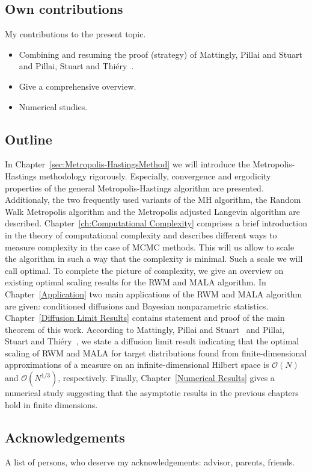 \subsection*{Own contributions}

My contributions to the present topic.
\begin{itemize}
 \item Combining and resuming the proof (strategy) of Mattingly, Pillai and Stuart~\autocite{Mattingly2010} and Pillai, Stuart and Thi\'{e}ry~\autocite{Pillai2012}.
 \item Give a comprehensive overview.
 \item Numerical studies.
\end{itemize}


\subsection*{Outline}

In Chapter~\ref{sec:Metropolis-HastingsMethod} we will introduce the Metropolis-Hastings methodology rigorously. Especially, convergence and ergodicity properties of the general Metropolis-Hastings algorithm are presented. Additionaly, the two frequently used variants of the MH algorithm, the Random Walk Metropolis algorithm and the Metropolis adjusted Langevin algorithm are described. Chapter~\ref{ch:Computational Complexity} comprises a brief introduction in the theory of computational complexity and describes different ways to measure complexity in the case of MCMC methods. This will us allow to scale the algorithm in such a way that the complexity is minimal. Such a scale we will call optimal. To complete the picture of complexity, we give an overview on existing optimal scaling results for the RWM and MALA algorithm. In Chapter~\ref{Application} two main applications of the RWM and MALA algorithm are given: conditioned diffusions and Bayesian nonparametric statistics. Chapter~\ref{Diffusion Limit Results} contains statement and proof of the main theorem of this work. According to Mattingly, Pillai and Stuart~\autocite{Mattingly2010} and Pillai, Stuart and Thi\'{e}ry~\autocite{Pillai2012}, we state a diffusion limit result indicating that the optimal scaling of RWM and MALA  for target distributions found from finite-dimensional approximations of a measure on an infinite-dimensional Hilbert space is $\mathcal{O}(N)$ and $\mathcal{O}(N^{1/3})$, respectively. Finally, Chapter~\ref{Numerical Results} gives a numerical study suggesting that the asymptotic results in the previous chapters hold in finite dimensions.


\subsection*{Acknowledgements}

A list of persons, who deserve my acknowledgements: advisor, parents, friends.



